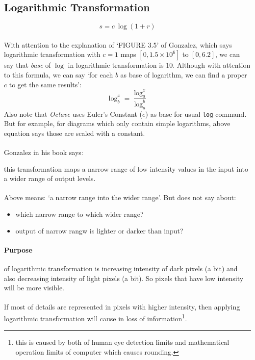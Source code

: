 \subsection{Logarithmic Transformation}

\[s=c\ \log(1+r)\]
\paragraph{}\label{note:note_about_log_base}
With attention to the explanation of `FIGURE 3.5' of Gonzalez, which
says logarithmic transformation with $c=1$ maps $[0,1.5 \times 10^6]$ to
$[0,6.2]$, we can say that \emph{base} of $\log$ in logarithmic transformation
is $10$. Although with attention to this formula, we can say `for each $b$ as
base of logarithm, we can find a proper $c$ to get the same results':
\[\log_b^x=\frac{\log_a^x}{\log_a^b}\]
Also note that \emph{Octave} uses Euler's Constant ($e$) as base for usual
\texttt{log} command. But for example, for diagrams which only contain simple
logarithms,  above equation says those are scaled with a constant.
\paragraph{}Gonzalez in his book says:
\begin{displayquote}
    this transformation maps a narrow range of low intensity values in the
    input into a wider range of output levels. 
\end{displayquote}
\paragraph{}Above means: `a narrow range into the wider range'. But does not say about:
\begin{itemize}
    \item which narrow range to which wider range?
    \item output of narrow rangw is lighter or darker than input?
\end{itemize}
\paragraph{Purpose} of logarithmic transformation is increasing intensity of
dark pixels (a bit) and also decreasing intensity of light pixels (a bit). So
pixels that have low intensity will be more visible. 

\paragraph*{}\care
    If most of details are represented in pixels with higher intensity, then
    applying logarithmic transformation will cause in loss of information\footnote{this is caused by both of human eye detection limits and mathematical operation limits of computer which causes rounding.}. 

